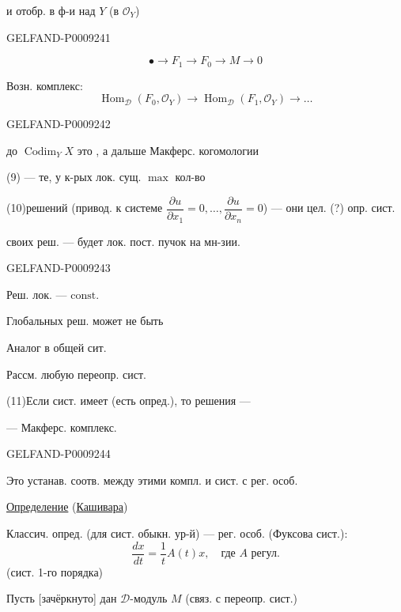 и отобр. в ф-и над $Y$ (в $\mathcal O_Y$)


\begin{GelfandAdjacentEvidence}{GELFAND-P000924}{1}

\[\bullet\longrightarrow F_1\longrightarrow F_0\longrightarrow M\longrightarrow0\]

Возн. комплекс:
\begin{equation*}
 \operatorname{Hom}_{\mathcal D}(F_0,\mathcal O_Y)
 \longrightarrow \operatorname{Hom}_{\mathcal D}(F_1,\mathcal O_Y)
 \longrightarrow\ldots
 \tag{8}
\end{equation*}
\end{GelfandAdjacentEvidence}
\begin{GelfandAdjacentEvidence}{GELFAND-P000924}{2}


до $\operatorname{Codim}_Y X$ это , а дальше Макферс. когомологии

(9)\quad {} --- те, у к-рых лок. сущ. $\max$ кол-во

(10)\quad решений (привод. к системе $\dfrac{\partial u}{\partial x_1}=0,\ldots,\dfrac{\partial u}{\partial x_n}=0$) --- они цел. (?) опр. сист.

своих реш. --- будет лок. пост. пучок на мн-зии.
\end{GelfandAdjacentEvidence}
\begin{GelfandAdjacentEvidence}{GELFAND-P000924}{3}


Реш. лок. --- $\mathrm{const}$.

Глобальных реш. может не быть

Аналог в общей сит.

Рассм. любую переопр. сист.

(11)\quad Если сист. имеет  (есть опред.), то решения ---

--- Макферс. комплекс.
\end{GelfandAdjacentEvidence}
\begin{GelfandAdjacentEvidence}{GELFAND-P000924}{4}


Это устанав. соотв. между этими компл. и сист. с рег. особ.

\underline{Определение} (\underline{Кашивара}) 

Классич. опред. (для сист. обыкн. ур-й) --- рег. особ. (Фуксова сист.):
\begin{equation*}
 \frac{dx}{dt}=\frac1t A(t)x,\quad\text{где }A\text{ регул}.
 \tag{12}
\end{equation*}
(сист. 1-го порядка)

Пусть [зачёркнуто] дан $\mathcal D$-модуль $M$ (связ. с переопр. сист.)
\end{GelfandAdjacentEvidence}
